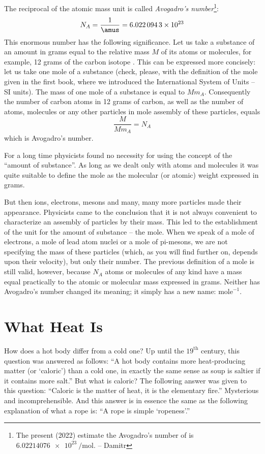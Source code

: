 The reciprocal of the atomic mass unit is called \emph{Avogadro's number}\footnote{The present (2022) estimate the Avogadro's number of is $\SI{6.02214076e23}{\per\mole}$. -- Damitr}:
\begin{equation*}%
N_{A} = \frac{1}{\si{\amus}} = \num{6.0220943e23}
\end{equation*}
This enormous number has the following significance. Let us take a substance of an amount in grams equal to the relative mass $M$ of its atoms or molecules, for example, 12 grams of the carbon isotope . This can be expressed more concisely: let us take one mole of a substance (check, please, with the definition of the mole given in the first book, where we introduced the International System of Units -- SI units). The mass of one mole of a substance is equal to $Mm_{A}$. Consequently the number of carbon atoms in 12 grams of carbon, as well as the number of atoms, molecules or any other particles in mole assembly of these particles, equals
\begin{equation*}%
\frac{M}{Mm_{A}} = N_{A}
\end{equation*}
which is Avogadro’s number.

For a long time physicists found no necessity for using
the concept of the ``amount of substance''. As long as we dealt only with atoms and molecules it was quite suitable to define the mole as the molecular (or atomic) weight expressed in grams.

But then ions, electrons, mesons and many, many more particles made their appearance. Physicists came to the conclusion that it is not always convenient to characterize an assembly of particles by their mass. This led to the establishment of the unit for the amount of substance -- the mole. When we speak of a mole of electrons, a mole of lead atom nuclei or a mole of pi-mesons, we are not specifying the mass of these particles (which, as you will find further on, depends upon their velocity), but only their number. The previous definition of a mole is still valid, however, because $N_{A}$ atoms or molecules of any kind have a mass equal practically to the atomic or molecular mass expressed in grams. Neither has Avogadro’s number changed its meaning; it simply has a new name: $\textrm{mole}^{-1}$.


\section{What Heat Is}

How does a hot body differ from a cold one? Up until the $19^{\textrm{th}}$ century, this question was answered as follows: ``A hot body contains more heat-producing matter (or `caloric') than a cold one, in exactly the same sense as soup is saltier if it contains more salt.'' But what is caloric? The following answer was given to this question: ``Caloric is the matter of heat, it is the elementary fire.'' Mysterious and incomprehensible. And this answer is in essence the same as the following explanation of what a rope is: ``A rope is simple `ropeness'.''

